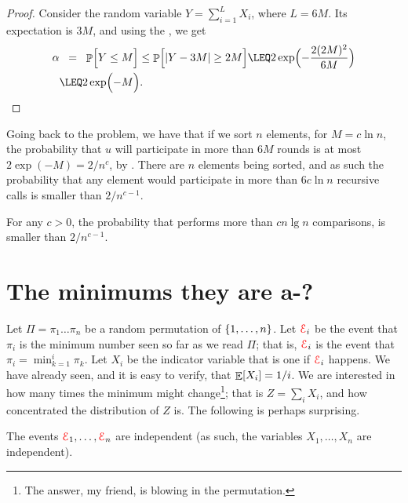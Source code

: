 \begin{proof}
    Consider the random variable $Y = \sum_{i=1}^L X_i$, where $L =
    6M$. Its expectation is $3M$, and using the
    , we
    get
    \begin{align*}
        \alpha%
        &\EQ%
        \Prob{\Bigl. Y \leq M}%
        \leq%
        \Prob{\Bigl.\cardin{Y - 3M} \geq 2M \bigr.}%
        \LEQ%
        2\exp \Bigl(-\frac{2(2M)^2}{ 6M } \Bigr)
        \\&
        \LEQ%
        2\exp\Bigl( -M   \Bigr).
    \end{align*}
\end{proof}


Going back to the \QuickSort{} problem, we have that if we sort $n$
elements, for $M=c \ln n$, the probability that $u$ will participate in
more than $6M$ rounds is at most $2\exp( -M) = 2/n^c$, by
.  There are $n$ elements being sorted, and as
such the probability that any element would participate in more than
$6 c \ln n$ recursive calls is smaller than $2/n^{c-1}$.
\begin{lemma}
    For any $c > 0$, the probability that \QuickSort{} performs more
    than $cn\lg n$ comparisons, is smaller than $2/n^{c-1}$.
\end{lemma}



\section{The minimums they are a-?}

Let $\Pi = \pi_1 \ldots \pi_n$ be a random permutation of $\left\{ {1,
   \ldots, n} \right\}$. Let ${\textcolor{red}{\EuScript{E}}}_i$ be the event that $\pi_i$ is the
minimum number seen so far as we read $\Pi$; that is, ${\textcolor{red}{\EuScript{E}}}_i$ is
the event that $\pi_i = \min_{k=1}^i \pi_k$. Let $X_i$ be the
indicator variable that is one if ${\textcolor{red}{\EuScript{E}}}_i$ happens. We have already seen,
and it is easy to verify, that $\mathop{\mathbb{E}}\!\left[ {X_i} \right] = 1/i$. We are interested in
how many times the minimum might change\footnote{The answer, my
   friend, is blowing in the permutation.}; that is $Z=\sum_i X_i$,
and how concentrated the distribution of $Z$ is. The following is
perhaps surprising.

\begin{lemma}
    The events ${\textcolor{red}{\EuScript{E}}}_1, \ldots, {\textcolor{red}{\EuScript{E}}}_n$ are independent (as such,
    the variables $X_1, \ldots, X_n$ are independent).
\end{lemma}

